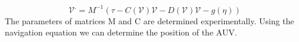 \documentclass[12pt]{dalcsthesis}
\begin{document}
\begin{equation}
\label{eq-: navigation equation for AUV}
\mathcal{V}^{.} = M^{-1}(\tau-C(\mathcal{V})\mathcal{V}-D(\mathcal{V})\mathcal{V}-g(\eta))
\end{equation}
The parameters of matrices M and C are determined experimentally. Using the navigation equation we can determine the position of the AUV.

\end{document}
